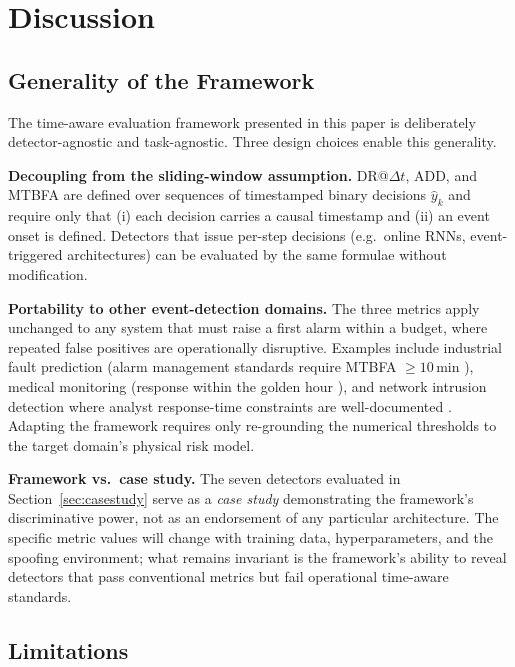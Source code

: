 
\section{Discussion}
\label{sec:discussion}

\subsection{Generality of the Framework}

The time-aware evaluation framework presented in this paper is deliberately
detector-agnostic and task-agnostic.  Three design choices enable this generality.

\textbf{Decoupling from the sliding-window assumption.}
DR@$\Delta t$, ADD, and MTBFA are defined over sequences of timestamped binary
decisions $\hat{y}_k$ and require only that (i) each decision carries a causal
timestamp and (ii) an event onset is defined.
Detectors that issue per-step decisions (e.g.\ online RNNs, event-triggered
architectures) can be evaluated by the same formulae without modification.

\textbf{Portability to other event-detection domains.}
The three metrics apply unchanged to any system that must raise a first alarm
within a budget, where repeated false positives are operationally disruptive.
Examples include industrial fault prediction (alarm management standards require
MTBFA $\geq 10\,\text{min}$ \cite{eemua191}), medical monitoring (response
within the golden hour \cite{iso11064}), and network intrusion detection where
analyst response-time constraints are well-documented \cite{axelsson2000base}.
Adapting the framework requires only re-grounding the numerical thresholds to the
target domain's physical risk model.

\textbf{Framework vs.\ case study.}
The seven detectors evaluated in Section~\ref{sec:casestudy} serve as a
\emph{case study} demonstrating the framework's discriminative power, not as
an endorsement of any particular architecture.
The specific metric values will change with training data, hyperparameters,
and the spoofing environment; what remains invariant is the framework's ability
to reveal detectors that pass conventional metrics but fail operational
time-aware standards.

\subsection{Limitations}

